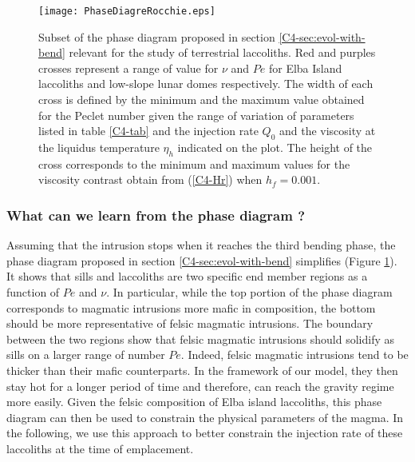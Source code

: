 \begin{figure}[h!]
  \begin{center}
    \graphicspath{ {/Users/thorey/Documents/These/Projet/Refroidissement/Skin_Model/Figure/Figure_Heating/} }
    \texttt{[image: PhaseDiagreRocchie.eps]}
    \caption{Subset  of   the  phase   diagram  proposed   in  section
      \ref{C4-sec:evol-with-bend}   relevant   for    the   study   of
      terrestrial  laccoliths. Red  and  purples  crosses represent  a
      range of value for $\nu$ and $Pe$ for Elba Island laccoliths and
      low-slope lunar domes  respectively. The width of  each cross is
      defined by  the minimum and  the maximum value obtained  for the
      Peclet number given the range  of variation of parameters listed
      in  table \ref{C4-tab}  and  the injection  rate  $Q_0$ and  the
      viscosity at the liquidus  temperature $\eta_h$ indicated on the
      plot. The  height of  the cross corresponds  to the  minimum and
      maximum   values  for   the  viscosity   contrast  obtain   from
      (\ref{C4-Hr}) when $h_f=0.001$.}
    \label{C4-PhaseDiag}
  \end{center}
\end{figure}

\subsubsection*{What can we learn from the phase diagram ?}

Assuming that  the intrusion stops  when it reaches the  third bending
phase,     the      phase     diagram     proposed      in     section
\ref{C4-sec:evol-with-bend}  simplifies  (Figure  \ref{C4-PhaseDiag}).
It shows that sills and laccoliths are two specific end member regions
as a function of $Pe$ and  $\nu$. In particular, while the top portion
of the phase diagram corresponds  to magmatic intrusions more mafic in
composition,  the  bottom  should  be more  representative  of  felsic
magmatic intrusions.  The  boundary between the two  regions show that
felsic magmatic intrusions should solidify  as sills on a larger range
of number $Pe$. Indeed, felsic  magmatic intrusions tend to be thicker
than their  mafic counterparts.  In  the framework of our  model, they
then stay hot for a longer period of time and therefore, can reach the
gravity  regime more  easily.  Given  the felsic  composition of  Elba
island laccoliths,  this phase diagram  can then be used  to constrain
the physical parameters  of the magma.  In the following,  we use this
approach to better constrain the injection rate of these laccoliths at
the time of emplacement.

